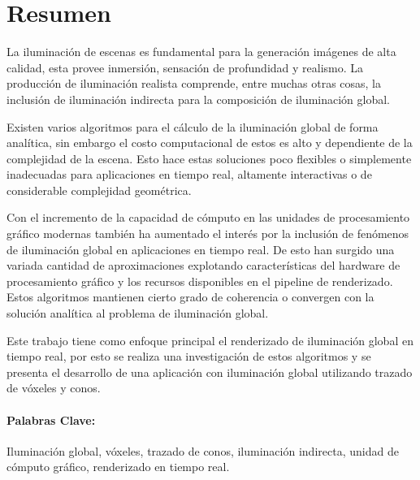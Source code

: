 \section*{Resumen}
La iluminación de escenas es fundamental para la generación imágenes de alta calidad, esta provee inmersión, sensación de profundidad y realismo. La producción de iluminación realista comprende, entre muchas otras cosas, la inclusión de iluminación indirecta para la composición de iluminación global.

Existen varios algoritmos para el cálculo de la iluminación global de forma analítica, sin embargo el costo computacional de estos es alto y dependiente de la complejidad de la escena. Esto hace estas soluciones poco flexibles o simplemente inadecuadas para aplicaciones en tiempo real, altamente interactivas o de considerable complejidad geométrica. 

Con el incremento de la capacidad de cómputo en las unidades de procesamiento gráfico modernas también ha aumentado el interés por la inclusión de fenómenos de iluminación global en aplicaciones en tiempo real. De esto han surgido una variada cantidad de aproximaciones explotando características del hardware de procesamiento gráfico y los recursos disponibles en el pipeline de renderizado. Estos algoritmos mantienen cierto grado de coherencia o convergen con la solución analítica al problema de iluminación global. 

Este trabajo tiene como enfoque principal el renderizado de iluminación global en tiempo real, por esto se realiza una investigación de estos algoritmos y se presenta el desarrollo de una aplicación con iluminación global utilizando trazado de vóxeles y conos.
\paragraph{Palabras Clave:}
Iluminación global, vóxeles, trazado de conos, iluminación indirecta, unidad de cómputo gráfico, renderizado en tiempo real.